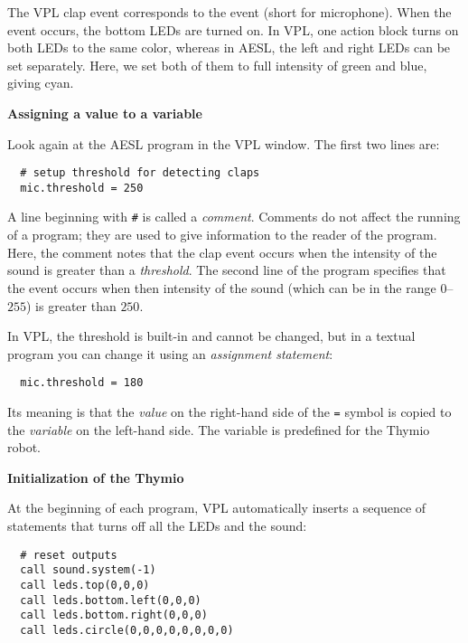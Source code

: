 The VPL clap event corresponds to the  event (short for
microphone). When the event occurs, the bottom LEDs are turned on. In
VPL, one action block turns on both LEDs to the same color, whereas in
AESL, the left and right LEDs can be set separately. Here, we set both
of them to full intensity of green and blue, giving cyan.

\textbf{\large Assigning a value to a variable}

Look again at the AESL program in the VPL window. The first two lines are:
\begin{footnotesize}
\begin{verbatim}
  # setup threshold for detecting claps
  mic.threshold = 250
\end{verbatim}
\end{footnotesize}

A line beginning with \verb+#+ is called a \emph{comment}. Comments do
not affect the running of a program; they are used to give information
to the reader of the program. Here, the comment notes that the clap
event occurs when the intensity of the sound is greater than a
\emph{threshold}. The second line of the program specifies that the
event occurs when then intensity of the sound (which can be in the range
$0$--$255$) is greater than $250$.

In VPL, the threshold is built-in and cannot be changed, but in a
textual program you can change it using an \emph{assignment statement}:
\begin{footnotesize}
\begin{verbatim}
  mic.threshold = 180
\end{verbatim}
\end{footnotesize}
Its meaning is that the \emph{value} on the right-hand side of the
\verb+=+ symbol is copied to the \emph{variable} on the left-hand side.
The variable  is predefined for the Thymio robot.

\textbf{\large Initialization of the Thymio}

At the beginning of each program, VPL automatically inserts a sequence
of statements that turns off all the LEDs and the sound:

\begin{footnotesize}
\begin{verbatim}
  # reset outputs
  call sound.system(-1)
  call leds.top(0,0,0)
  call leds.bottom.left(0,0,0)
  call leds.bottom.right(0,0,0)
  call leds.circle(0,0,0,0,0,0,0,0)
\end{verbatim}
\end{footnotesize}


